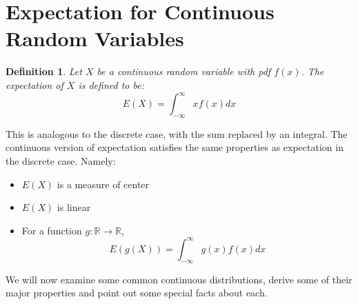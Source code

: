 \documentclass[12pt]{article} %
\newtheorem{defn}{Definition}
\begin{document}
\section{Expectation for Continuous Random Variables}
\begin{defn}
Let $X$ be a continuous random variable with pdf $f(x)$. The expectation of $X$ is defined to be:
$$E(X) = \int_{-\infty}^{\infty} x f(x) dx$$
\end{defn}
This is analogous to the discrete case, with the sum replaced by an integral. The continuous version of expectation satisfies the same properties as expectation in the discrete case. Namely:
\begin{itemize}
\item $E(X)$ is a measure of center
\item $E(X)$ is linear
\item For a function $g:\mathbb{R}\rightarrow \mathbb{R}$, 
$$E(g(X)) = \int_{-\infty}^{\infty} g(x) f(x) dx$$
\end{itemize} 

We will now examine some common continuous distributions, derive some of their major properties and point out some special facts about each.
\end{document}
